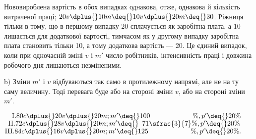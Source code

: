Нововироблена вартість в обох випадках однакова, отже, однакова
й кількість витраченої праці; $20 v \dplus{} 10 m \deq{} 10 v \dplus{} 20 m \deq{} 30$.
Ріжниця тільки в тому, що в першому випадку 20 сплачується
як заробітна плата, а 10 лишається для додаткової вартості,
тимчасом як у другому випадку заробітна плата становить
тільки 10, а тому додаткова вартість — 20. Це єдиний випадок,
коли при одночасній зміні $v$ і $m'$ число робітників, інтенсивність
праці і довжина робочого дня лишаються незміненими.

b) Зміни $m'$ і $v$ відбуваються так само в протилежному напрямі,
але не на ту саму величину. Тоді перевага буде або на
стороні зміни $v$, або на стороні зміни $m'$.
\begin{center}
$\phantom{II}\text{I.} 80 c \dplus{} 20 v \dplus{} 20 m; m' \deq{} 100\phantom{\sfrac{3}{7}}\%, p' \deq{} 20\%$
$\phantom{I}\text{II.}72 c \dplus{} 28 v \dplus{} 20 m; m' \deq{} \phantom{0}71\sfrac{3}{7}\%, p' \deq{} 20\%$
$\text{III.} 84 c \dplus{} 16 v \dplus{} 20 m; m' \deq{} 125\phantom{\sfrac{3}{7}}\%, p' \deq{} 20\%.$
\end{center}
